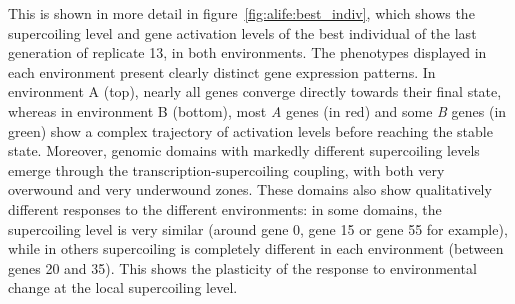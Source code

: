 This is shown in more detail in figure~\ref{fig:alife:best_indiv}, which shows the supercoiling level and gene activation levels of the best individual of the last generation of replicate 13, in both environments.
The phenotypes displayed in each environment present clearly distinct gene expression patterns.
In environment A (top), nearly all genes converge directly towards their final state, whereas in environment B (bottom), most \emph{A} genes (in red) and some \emph{B} genes (in green) show a complex trajectory of activation levels before reaching the stable state.
Moreover, genomic domains with markedly different supercoiling levels emerge through the transcription-supercoiling coupling, with both very overwound and very underwound zones.
These domains also show qualitatively different responses to the different environments: in some domains, the supercoiling level is very similar (around gene 0, gene 15 or gene 55 for example), while in others supercoiling is completely different in each environment (between genes 20 and 35).
This shows the plasticity of the response to environmental change at the local supercoiling level.

